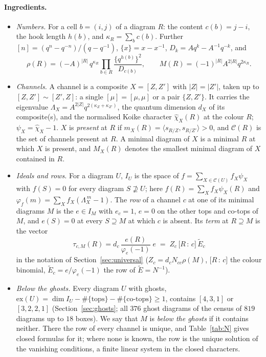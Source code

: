 \documentclass[11pt]{article}
\newcommand{\Lam}{\Lambda}
\newcommand{\Et}{\widetilde{E}}
\newcommand{\Chan}{\mathcal C}
\newcommand{\chih}{\hat\chi}
\newcommand{\cf}[2]{\bigl[#1\,{:}\,#2\bigr]}
\begin{document}
\paragraph{Ingredients.}
\begin{itemize}
\item \emph{Numbers.}  For a cell $b=(i,j)$ of a diagram $R$: the content $c(b)=j-i$, the hook length $h(b)$, and
$\kappa_R=\sum_bc(b)$.  Further $[n]=(q^n-q^{-n})/(q-q^{-1})$, $\{x\}=x-x^{-1}$, $D_k=Aq^k-A^{-1}q^{-k}$, and
\[
\rho(R)=(-A)^{|R|}\,q^{\kappa_R}\prod_{b\in R}\frac{\{q^{h(b)}\}^2}{D_{c(b)}},\qquad M(R)=(-1)^{|R|}A^{2|R|}q^{2\kappa_R}.
\]
\item \emph{Channels.}  A channel is a composite $X=[Z,Z']$ with $|Z|=|Z'|$, taken up to $[Z,Z']\sim[Z',Z]$: a single
$[\mu]=[\mu,\mu]$ or a pair $\{Z,Z'\}$.  It carries the eigenvalue $\Lam_X=A^{2|Z|}q^{2(\kappa_Z+\kappa_{Z'})}$, the
quantum dimension $d_X$ of its composite(s), and the normalised Koike character $\chih_X(R)$ at the colour $R$;
$\psi_X=\chih_X-1$.  $X$ is \emph{present} at $R$ if $m_X(R)=\langle s_{R/Z},s_{R/Z'}\rangle>0$, and $\Chan(R)$ is the set
of channels present at $R$.  A minimal diagram of $X$ is a minimal $R$ at which $X$ is present, and $M_X(R)$ denotes
the smallest minimal diagram of $X$ contained in $R$.
\item \emph{Ideals and rows.}  For a diagram $U$, $I_U$ is the space of $f=\sum_{X\in\Chan(U)}f_X\psi_X$ with $f(S)=0$
for every diagram $S\not\supseteq U$; here $f(R)=\sum_Xf_X\psi_X(R)$ and $\varphi_f(m)=\sum_Xf_X(\Lam_X^{\,m}-1)$.  The
\emph{row} of a channel $c$ at one of its minimal diagrams $M$ is the $e\in I_M$ with $e_c=1$, $e=0$ on the other tops
and co-tops of $M$, and $e(S)=0$ at every $S\supseteq M$ at which $c$ is absent.  Its \emph{term} at $R\supseteq M$ is
the vector
\[
\tau_{c,M}(R)=d_c\,\frac{e(R)}{\varphi_e(-1)}\;e\;=\;Z_c\,\cf Rc\,\Et_c
\]
in the notation of Section~\ref{sec:universal} ($Z_c=d_cN_{cc}\rho(M)$, $\cf Rc$ the colour binomial, $\Et_c=e/\varphi_e(-1)$
the row of $\Et=N^{-1}$).
\item \emph{Below the ghosts.}  Every diagram $U$ with ghosts, $\mathrm{ex}(U)=\dim I_U-\#\{\text{tops}\}
-\#\{\text{co-tops}\}\ge1$, contains $[4,3,1]$ or $[3,2,2,1]$ (Section~\ref{sec:ghosts}; all $376$ ghost diagrams of the
census of $819$ diagrams up to $18$ boxes).  We say that $M$ is \emph{below the ghosts} if it contains neither.  There the
row of every channel is unique, and Table~\ref{tab:N} gives closed formulas for it; where none is known, the row is the
unique solution of the vanishing conditions, a finite linear system in the closed characters.
\end{itemize}
\end{document}
